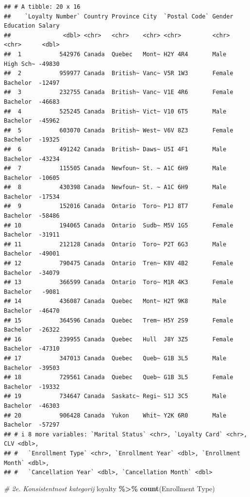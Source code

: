 \documentclass[
]{article}
\newenvironment{Shaded}{\begin{snugshade}}{\end{snugshade}}
\newcommand{\AttributeTok}[1]{\textcolor[rgb]{0.13,0.29,0.53}{#1}}
\newcommand{\CommentTok}[1]{\textcolor[rgb]{0.56,0.35,0.01}{\textit{#1}}}
\newcommand{\FunctionTok}[1]{\textcolor[rgb]{0.13,0.29,0.53}{\textbf{#1}}}
\newcommand{\NormalTok}[1]{#1}
\newcommand{\SpecialCharTok}[1]{\textcolor[rgb]{0.81,0.36,0.00}{\textbf{#1}}}
\newcommand{\StringTok}[1]{\textcolor[rgb]{0.31,0.60,0.02}{#1}}
\begin{document}
\begin{verbatim}
## # A tibble: 20 x 16
##    `Loyalty Number` Country Province City  `Postal Code` Gender Education Salary
##               <dbl> <chr>   <chr>    <chr> <chr>         <chr>  <chr>      <dbl>
##  1           542976 Canada  Quebec   Mont~ H2Y 4R4       Male   High Sch~ -49830
##  2           959977 Canada  British~ Vanc~ V5R 1W3       Female Bachelor  -12497
##  3           232755 Canada  British~ Vanc~ V1E 4R6       Female Bachelor  -46683
##  4           525245 Canada  British~ Vict~ V10 6T5       Male   Bachelor  -45962
##  5           603070 Canada  British~ West~ V6V 8Z3       Female Bachelor  -19325
##  6           491242 Canada  British~ Daws~ U5I 4F1       Male   Bachelor  -43234
##  7           115505 Canada  Newfoun~ St. ~ A1C 6H9       Male   Bachelor  -10605
##  8           430398 Canada  Newfoun~ St. ~ A1C 6H9       Male   Bachelor  -17534
##  9           152016 Canada  Ontario  Toro~ P1J 8T7       Female Bachelor  -58486
## 10           194065 Canada  Ontario  Sudb~ M5V 1G5       Female Bachelor  -31911
## 11           212128 Canada  Ontario  Toro~ P2T 6G3       Male   Bachelor  -49001
## 12           790475 Canada  Ontario  Tren~ K8V 4B2       Female Bachelor  -34079
## 13           366599 Canada  Ontario  Toro~ M1R 4K3       Female Bachelor   -9081
## 14           436087 Canada  Quebec   Mont~ H2T 9K8       Male   Bachelor  -46470
## 15           364596 Canada  Quebec   Trem~ H5Y 2S9       Female Bachelor  -26322
## 16           239955 Canada  Quebec   Hull  J8Y 3Z5       Female Bachelor  -47310
## 17           347013 Canada  Quebec   Queb~ G1B 3L5       Male   Bachelor  -39503
## 18           729561 Canada  Quebec   Queb~ G1B 3L5       Female Bachelor  -19332
## 19           734647 Canada  Saskatc~ Regi~ S1J 3C5       Male   Bachelor  -46303
## 20           906428 Canada  Yukon    Whit~ Y2K 6R0       Male   Bachelor  -57297
## # i 8 more variables: `Marital Status` <chr>, `Loyalty Card` <chr>, CLV <dbl>,
## #   `Enrollment Type` <chr>, `Enrollment Year` <dbl>, `Enrollment Month` <dbl>,
## #   `Cancellation Year` <dbl>, `Cancellation Month` <dbl>
\end{verbatim}

\begin{Shaded}
\begin{Highlighting}[]
\CommentTok{\# 2e. Konsistentnost kategorij}
\NormalTok{loyalty }\SpecialCharTok{\%\textgreater{}\%} \FunctionTok{count}\NormalTok{(}\StringTok{\textasciigrave{}}\AttributeTok{Enrollment Type}\StringTok{\textasciigrave{}}\NormalTok{)}
\end{Highlighting}
\end{Shaded}
\end{document}
